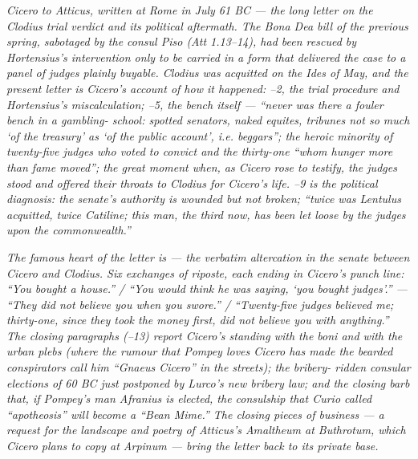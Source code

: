 
\textit{Cicero to Atticus, written at Rome in July 61 BC ---
the long letter on the Clodius trial verdict and its
political aftermath. The Bona Dea bill of the previous
spring, sabotaged by the consul Piso (Att 1.13--14), had
been rescued by Hortensius's intervention only to be carried
in a form that delivered the case to a panel of judges
plainly buyable. Clodius was acquitted on the Ides of May,
and the present letter is Cicero's account of how it
happened: --2, the trial procedure and
Hortensius's miscalculation; --5, the bench
itself --- ``never was there a fouler bench in a gambling-
school: spotted senators, naked equites, tribunes not so
much `of the treasury' as `of the public account', i.e.
beggars''; the heroic minority of twenty-five judges who
voted to convict and the thirty-one ``whom hunger more than
fame moved''; the great moment when, as Cicero rose to
testify, the judges stood and offered their throats to
Clodius for Cicero's life. --9 is the political
diagnosis: the senate's authority is wounded but not
broken; ``twice was Lentulus acquitted, twice Catiline; this
man, the third now, has been let loose by the judges upon
the commonwealth.''}

\textit{The famous heart of the letter is 
--- the verbatim altercation in the senate between Cicero
and Clodius. Six exchanges of riposte, each ending in
Cicero's punch line: ``You bought a house.'' / ``You would
think he was saying, `you bought judges'.'' --- ``They did
not believe you when you swore.'' / ``Twenty-five judges
believed me; thirty-one, since they took the money first,
did not believe you with anything.'' The closing
paragraphs (--13) report Cicero's standing
with the boni and with the urban plebs (where the rumour
that Pompey loves Cicero has made the bearded conspirators
call him ``Gnaeus Cicero'' in the streets); the bribery-
ridden consular elections of 60 BC just postponed by
Lurco's new bribery law; and the closing barb that, if
Pompey's man Afranius is elected, the consulship that
Curio called ``apotheosis'' will become a ``Bean Mime.''
The closing pieces of business --- a request for the
landscape and poetry of Atticus's Amaltheum at Buthrotum,
which Cicero plans to copy at Arpinum --- bring the letter
back to its private base.}

